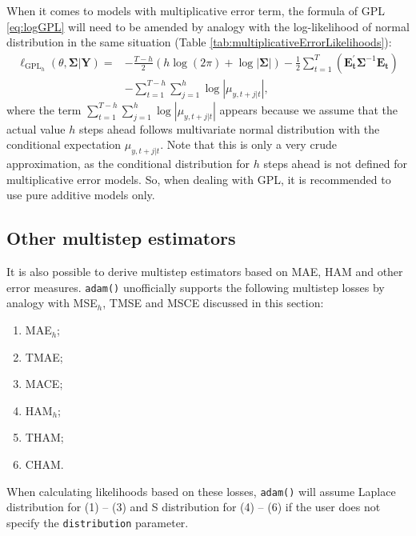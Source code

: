 \documentclass[]{book}
\providecommand{\tightlist}{%
  \setlength{\itemsep}{0pt}\setlength{\parskip}{0pt}}
\theoremstyle{definition}
\theoremstyle{definition}
\theoremstyle{definition}
\theoremstyle{definition}
\theoremstyle{remark}
\begin{document}
When it comes to models with multiplicative error term, the formula of GPL \eqref{eq:logGPL} will need to be amended by analogy with the log-likelihood of normal distribution in the same situation (Table \ref{tab:multiplicativeErrorLikelihoods}):
\begin{equation}
    \begin{aligned}
    \ell_{\mathrm{GPL}_h}(\theta, \boldsymbol{\Sigma} | \mathbf{Y}) = & -\frac{T-h}{2} \left( h \log(2 \pi) + \log | \boldsymbol{\Sigma}| \right) -\frac{1}{2} \sum_{t=1}^T \left( \mathbf{E_t^\prime} \boldsymbol{\Sigma}^{-1} \mathbf{E_t} \right) \\
                        & -\sum_{t=1}^{T-h} \sum_{j=1}^h \log |\mu_{y,t+j|t}|,
    \end{aligned}
  \label{eq:logGPLMultiplicative}
\end{equation}
where the term \(\sum_{t=1}^{T-h} \sum_{j=1}^h \log |\mu_{y,t+j|t}|\) appears because we assume that the actual value \(h\) steps ahead follows multivariate normal distribution with the conditional expectation \(\mu_{y,t+j|t}\). Note that this is only a very crude approximation, as the conditional distribution for \(h\) steps ahead is not defined for multiplicative error models. So, when dealing with GPL, it is recommended to use pure additive models only.

\hypertarget{other-multistep-estimators}{%
\subsection{Other multistep estimators}\label{other-multistep-estimators}}

It is also possible to derive multistep estimators based on MAE, HAM and other error measures. \texttt{adam()} unofficially supports the following multistep losses by analogy with MSE\(_h\), TMSE and MSCE discussed in this section:

\begin{enumerate}
\def\labelenumi{\arabic{enumi}.}
\tightlist
\item
  MAE\(_h\);
\item
  TMAE;
\item
  MACE;
\item
  HAM\(_h\);
\item
  THAM;
\item
  CHAM.
\end{enumerate}

When calculating likelihoods based on these losses, \texttt{adam()} will assume Laplace distribution for (1) -- (3) and S distribution for (4) -- (6) if the user does not specify the \texttt{distribution} parameter.
\end{document}

